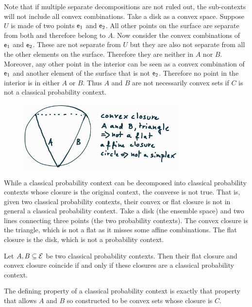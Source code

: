 \begin{mathSection}
	\begin{remark}
		Note that if multiple separate decompositions are not ruled out, the sub-contexts will not include all convex combinations. Take a disk as a convex space. Suppose $U$ is made of two points $\mathsf{e}_1$ and $\mathsf{e}_2$. All other points on the surface are separate from both and therefore belong to $A$. Now consider the convex combinations of $\mathsf{e}_1$ and $\mathsf{e}_2$. These are not separate from $U$ but they are also not separate from all the other elements on the surface. Therefore they are neither in $A$ nor $B$. Moreover, any other point in the interior can be seen as a convex combination of $\mathsf{e}_1$ and another element of the surface that is not $\mathsf{e}_2$. Therefore no point in the interior is in either $A$ or $B$. Thus $A$ and $B$ are not necessarily convex sets if $C$ is not a classical probability context.
	\end{remark}
	
	\begin{figure}[H]
		\centering
		\includegraphics[width=0.75\textwidth]{tempimages/ContextClosureNotContext.jpg}
	\end{figure}
	
	\begin{remark}
		While a classical probability context can be decomposed into classical probability contexts whose closure is the original context, the converse is not true. That is, given two classical probability contexts, their convex or flat closure is not in general a classical probability context. Take a disk (the ensemble space) and two lines connecting three points (the two probability contexts). The convex closure is the triangle, which is not a flat as it misses some affine combinations. The flat closure is the disk, which is not a probability context.
	\end{remark}
	
	\begin{conj}
		Let $A, B \subseteq \mathcal{E}$ be two classical probability contexts. Then their flat closure and convex closure coincide if and only if these closures are a classical probability context.
	\end{conj}
	
	\begin{conj}
		The defining property of a classical probability context is exactly that property that allows $A$ and $B$ so constructed to be convex sets whose closure is $C$.
	\end{conj}
\end{mathSection}

